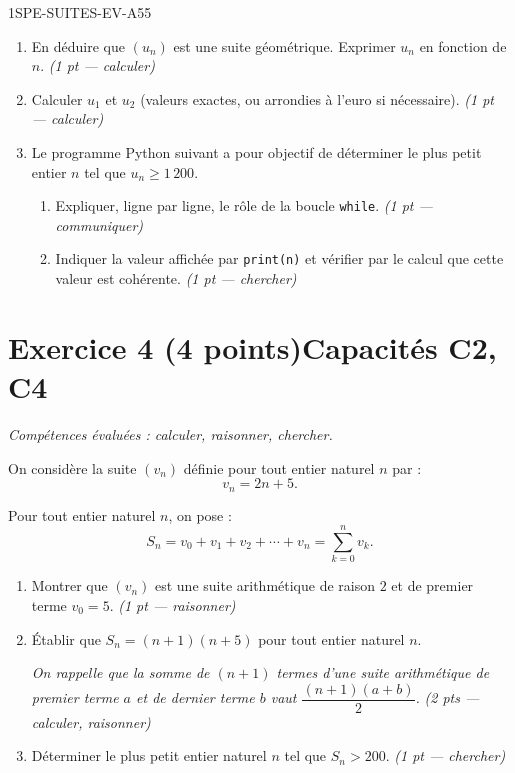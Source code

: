 \begin{evaluation}{1SPE-SUITES-EV-A}{55}
\begin{enumerate}
  \item En déduire que $(u_n)$ est une suite géométrique. Exprimer $u_n$ en fonction de $n$.
  \ifnxVersionProfesseur\hfill\textit{(1 pt — calculer)}\fi

  \item Calculer $u_1$ et $u_2$ (valeurs exactes, ou arrondies à l'euro si nécessaire).
  \ifnxVersionProfesseur\hfill\textit{(1 pt — calculer)}\fi

  \item Le programme Python suivant a pour objectif de déterminer le plus petit entier $n$ tel que $u_n \geq 1\,200$.



  \begin{enumerate}
    \item Expliquer, ligne par ligne, le rôle de la boucle \texttt{while}.
    \ifnxVersionProfesseur\hfill\textit{(1 pt — communiquer)}\fi
    \item Indiquer la valeur affichée par \texttt{print(n)} et vérifier par le calcul que cette valeur est cohérente.
    \ifnxVersionProfesseur\hfill\textit{(1 pt — chercher)}\fi
  \end{enumerate}
\end{enumerate}

\section*{Exercice 4 \ifnxVersionProfesseur\hfill (4 points)\fi \hfill Capacités C2, C4}

\textit{Compétences évaluées : calculer, raisonner, chercher.}

\medskip
On considère la suite $(v_n)$ définie pour tout entier naturel $n$ par :
\[
  v_n = 2n + 5.
\]

Pour tout entier naturel $n$, on pose :
\[
  S_n = v_0 + v_1 + v_2 + \cdots + v_n = \sum_{k=0}^{n} v_k.
\]

\begin{enumerate}
  \item Montrer que $(v_n)$ est une suite arithmétique de raison $2$ et de premier terme $v_0 = 5$.
  \ifnxVersionProfesseur\hfill\textit{(1 pt — raisonner)}\fi

  \item Établir que $S_n = (n+1)(n+5)$ pour tout entier naturel $n$.

  \textit{On rappelle que la somme de $(n+1)$ termes d'une suite arithmétique de premier terme $a$ et de dernier terme $b$ vaut $\dfrac{(n+1)(a+b)}{2}$.}
  \ifnxVersionProfesseur\hfill\textit{(2 pts — calculer, raisonner)}\fi

  \item Déterminer le plus petit entier naturel $n$ tel que $S_n > 200$.
  \ifnxVersionProfesseur\hfill\textit{(1 pt — chercher)}\fi
\end{enumerate}

\end{evaluation}
